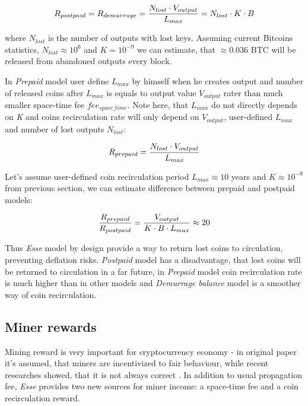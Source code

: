 \documentclass[]{article}   %
\newcommand{\esse}{\textit{Esse}}
\begin{document}
\begin{equation}
R_{postpaid} = R_{demurrage} = {N_{lost} \cdot V_{output} \over L_{max}} = {N_{lost} \cdot K \cdot B}
\end{equation}

where $N_{lost}$ is the number of outputs with lost keys. Assuming current Bitcoins statistics, $N_{lost}\approx10^6$ and $K = 10^{-9}$ we can estimate, that $\approx0.036$ BTC will be released from abandoned outputs every block.

In \textit{Prepaid} model user define $L_{max}$ by himself when he creates output and number of released coins after $L_{max}$ is equals to output value $V_{output}$ rater than much smaller space-time fee $fee_{space\_time}$. Note here, that $L_{max}$ do not directly depends on \textit{K} and coins recirculation rate will only depend on $V_{output}$, user-defined $L_{max}$ and number of lost outputs $N_{lost}$:

\begin{equation}
R_{prepaid} = {N_{lost} \cdot V_{output} \over L_{max}}
\end{equation}

Let's assume user-defined coin recirculation period $L_{max}\approx10$ years and $K\approx10^{-9}$ from previous section, we can estimate difference between prepaid and postpaid models:

\begin{equation}
{R_{prepaid} \over R_{postpaid}} = { V_{output}  \over  K \cdot B \cdot L_{max}} \approx 20
\end{equation}

Thus \esse{} model by design provide a way to return lost coins to circulation, preventing deflation risks. \textit{Postpaid} model has a disadvantage, that lost coins will be returned to circulation in a far future, in \textit{Prepaid} model coin recirculation rate is much higher than in other models and \textit{Demurrage balance} model is a smoother way of coin recirculation.

\subsection{Miner rewards}
\label{minerrew}
Mining reward is very important for cryptocurrency economy - in original paper \cite{Nakamoto2008} it's assumed, that miners are incentivized to fair behaviour, while recent researches showed, that it is not always correct \cite{carlsten2016instability, eyal2014}. In addition to usual propagation fee, \esse{} provides two new sources for miner income: a space-time fee and a coin recirculation reward.
\end{document}
